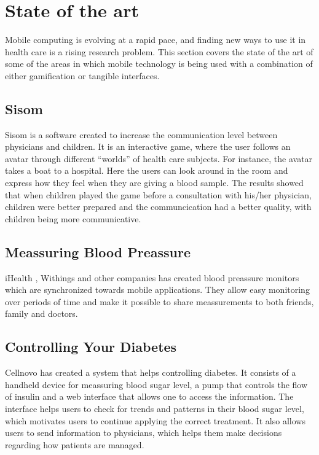 \section{State of the art}
Mobile computing is evolving at a rapid pace, and finding new ways to use it in health care is a rising research problem. This section covers the state of the art of some of the areas in which mobile technology is being used with a combination of either gamification or tangible interfaces.      

\subsection{Sisom}
Sisom is a software created to increase the communication level between physicians and children. It is an interactive game, where the user follows an avatar through different ``worlds'' of health care subjects. For instance, the avatar takes a boat to a hospital. Here the users can look around in the room and express how they feel when they are giving a blood sample. The results showed that when children played the game before a consultation with his/her physician, children were better prepared and the communcication had a better quality, with children being more communicative\cite{sisom-research}.


\subsection{Meassuring Blood Preassure}
iHealth  , Withings and other companies has created blood preassure monitors which are synchronized towards mobile applications. They allow easy monitoring over periods of time and make it possible to share meassurements to both friends, family and doctors.


\subsection{Controlling Your Diabetes}
Cellnovo has created a system that helps controlling diabetes. It consists of a handheld device for meassuring blood sugar level, a pump that controls the flow of insulin and a web interface that allows one to access the information. The interface helps users to check for trends and patterns in their blood sugar level, which motivates users to continue applying the correct treatment. It also allows users to send information to physicians, which helps them make decisions regarding how patients are managed.
      



